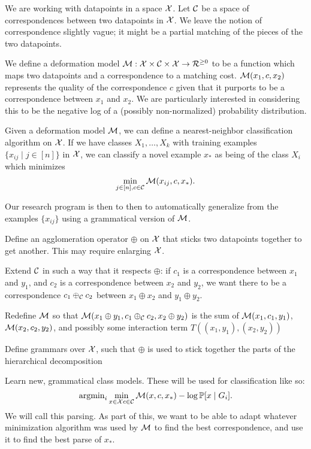 \documentclass{article}
\begin{document}
We are working with datapoints in a space ${\mathcal X}$. Let ${\mathcal C}$ be a
space of correspondences between two datapoints in ${\mathcal X}$.  We leave the
notion of correspondence slightly vague; it might be a partial
matching of the pieces of the two datapoints.

We define a deformation model ${\mathcal M}: {\mathcal X} \times {\mathcal C} \times {\mathcal X} \to
{\mathcal R}^{\ge 0}$ to be a function which maps two datapoints and a
correspondence to a matching cost. ${\mathcal M}(x_1, c, x_2)$ represents the
quality of the correspondence $c$ given that it purports to be a
correspondence between $x_1$ and $x_2$. We are particularly interested
in considering this to be the negative log of a (possibly
non-normalized) probability distribution.

Given a deformation model ${\mathcal M}$, we can define a nearest-neighbor
classification algorithm on ${\mathcal X}$. If we have classes $X_1,\dots,X_k$ with
training examples $\{x_{ij} \mid j\in [n] \}$ in ${\mathcal X}$, we can classify a novel
example $x_*$ as being of the class $X_i$ which minimizes 
$$\min_{j\in [n], c\in {\mathcal C}} {\mathcal M}(x_{ij}, c, x_*).$$

Our research program is then to then to automatically generalize from the
examples $\{x_{ij}\}$ using a grammatical version of ${\mathcal M}$.

\bitem
\item Define an agglomeration operator $\oplus$ on ${\mathcal X}$ that sticks
  two datapoints together to get another. This may require enlarging
  ${\mathcal X}$.
\item Extend ${\mathcal C}$ in such a way that it respects $\oplus$: if $c_1$
  is a correspondence between $x_1$ and $y_1$, and $c_2$ is a
  correspondence between $x_2$ and $y_2$, we want there to be a
  correspondence $c_1 \oplus_{\mathcal C} c_2$ between $x_1\oplus x_2$ and
  $y_1\oplus y_2$.
\item Redefine ${\mathcal M}$ so that ${\mathcal M}( x_1\oplus y_1, c_1 \oplus_{\mathcal C}
  c_2, x_2\oplus y_2 )$ is the sum of ${\mathcal M}(x_1,c_1,y_1)$,
  ${\mathcal M}(x_2,c_2,y_2)$, and possibly some interaction term $T( (x_1,y_1), (x_2,y_2) )$

\item Define grammars over ${\mathcal X}$, such that $\oplus$ is used to stick
  together the parts of the hierarchical decomposition

\item Learn new, grammatical class models. These will be used for
  classification like so:
$$\operatorname{argmin}_i \min_{x\in {\mathcal X} c\in {\mathcal C}} {\mathcal M}(x, c, x_*) - \log\mathbb{P}[x
    \mid G_i].$$ We will call this parsing.  As part of this, we want
  to be able to adapt whatever minimization algorithm was used by
  ${\mathcal M}$ to find the best correspondence, and use it to find the best
  parse of $x_*$.  
\eitem
\end{document}
